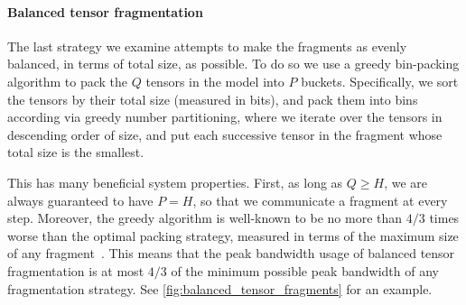 \documentclass[11pt, a4paper, twocolumn, copyright, google]{google}
\begin{document}
\paragraph{Balanced tensor fragmentation}

The last strategy we examine attempts to make the fragments as evenly balanced, in terms of total size, as possible. To do so we use a greedy bin-packing algorithm to pack the $Q$ tensors in the model into $P$ buckets. Specifically, we sort the tensors by their total size (measured in bits), and pack them into bins according via greedy number partitioning, where we iterate over the tensors in descending order of size, and put each successive tensor in the fragment whose total size is the smallest.

This has many beneficial system properties. First, as long as $Q \geq H$, we are always guaranteed to have $P = H$, so that we communicate a fragment at every step. Moreover, the greedy algorithm is well-known to be no more than $4/3$ times worse than the optimal packing strategy, measured in terms of the maximum size of any fragment~\citep{graham1969bounds}. This means that the peak bandwidth usage of balanced tensor fragmentation is at most $4/3$ of the minimum possible peak bandwidth of any fragmentation strategy. See \autoref{fig:balanced_tensor_fragments} for an example.
\end{document}
